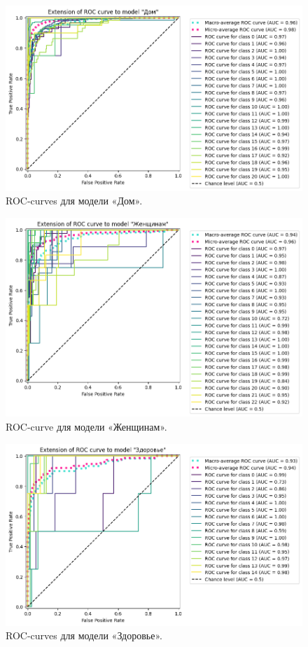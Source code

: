 \documentclass[a4paper,12pt]{extarticle}
\begin{document}
\begin{figure}[hbtp]
	\centering
	\includegraphics[scale=0.7]{roc_curves/roccurve_Дом.png}
	\caption{ROC-curves для модели «Дом».}
	\label{fig:roccurve_Дом}
\end{figure}

\begin{figure}[hbtp]
	\centering
	\includegraphics[scale=0.7]{roc_curves/roccurve_Женщинам.png}
	\caption{ROC-curve для модели «Женщинам».}
	\label{fig:roccurve_Женщинам}
\end{figure}

\begin{figure}[hbtp]
	\centering
	\includegraphics[scale=0.7]{roc_curves/roccurve_Здоровье.png}
	\caption{ROC-curves для модели «Здоровье».}
	\label{fig:roccurve_Здоровье}
\end{figure}
\end{document}
